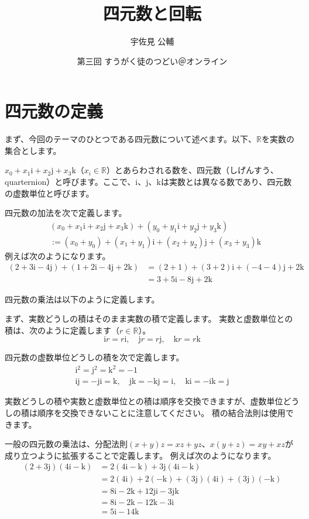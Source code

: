 \documentclass{jlreq}
\title{四元数と回転}
\author{宇佐見 公輔}
\date{第三回 すうがく徒のつどい＠オンライン}
\numberwithin{equation}{section}
\newcommand{\ii}{\mathrm{i}}
\newcommand{\jj}{\mathrm{j}}
\newcommand{\kk}{\mathrm{k}}
\begin{document}
\maketitle

\section{四元数の定義}

まず、今回のテーマのひとつである四元数について述べます。以下、\(\mathbb{R}\)を実数の集合とします。

\begin{definition}
    \(x_0+x_1\ii+x_2\jj+x_3\kk\)（\(x_i\in\mathbb{R}\)）とあらわされる数を、四元数（しげんすう、quarternion）と呼びます。ここで、\(\ii\)、\(\jj\)、\(\kk\)は実数とは異なる数であり、四元数の虚数単位と呼びます。
\end{definition}

四元数の加法を次で定義します。
\begin{align}
     & (x_0+x_1\ii+x_2\jj+x_3\kk)+(y_0+y_1\ii+y_2\jj+y_3\kk) \\
     & :=(x_0+y_0)+(x_1+y_1)\ii+(x_2+y_2)\jj+(x_3+y_3)\kk
\end{align}
例えば次のようになります。
\begin{align}
    (2+3\ii-4\jj)+(1+2\ii-4\jj+2\kk) & =(2+1)+(3+2)\ii+(-4-4)\jj+2\kk \\
                                     & =3+5\ii-8\jj+2\kk
\end{align}

四元数の乗法は以下のように定義します。

まず、実数どうしの積はそのまま実数の積で定義します。
実数と虚数単位との積は、次のように定義します（\(r\in\mathbb{R}\)）。
\[
    \ii r=r\ii,\quad\jj r=r\jj,\quad\kk r=r\kk
\]

\begin{definition}
    四元数の虚数単位どうしの積を次で定義します。
    \begin{gather}
        \ii^2=\jj^2=\kk^2=-1\\
        \ii\jj=-\jj\ii=\kk,\quad\jj\kk=-\kk\jj=\ii,\quad\kk\ii=-\ii\kk=\jj
    \end{gather}
\end{definition}

実数どうしの積や実数と虚数単位との積は順序を交換できますが、虚数単位どうしの積は順序を交換できないことに注意してください。
積の結合法則は使用できます。

一般の四元数の乗法は、分配法則\((x+y)z=xz+yz\)、\(x(y+z)=xy+xz\)が成り立つように拡張することで定義します。
例えば次のようになります。
\begin{align}
    (2+3\jj)(4\ii-\kk) & =2(4\ii-\kk)+3\jj(4\ii-\kk)                \\
                       & =2(4\ii)+2(-\kk)+(3\jj)(4\ii)+(3\jj)(-\kk) \\
                       & =8\ii-2\kk+12\jj\ii-3\jj\kk                \\
                       & =8\ii-2\kk-12\kk-3\ii                      \\
                       & =5\ii-14\kk
\end{align}
\end{document}
